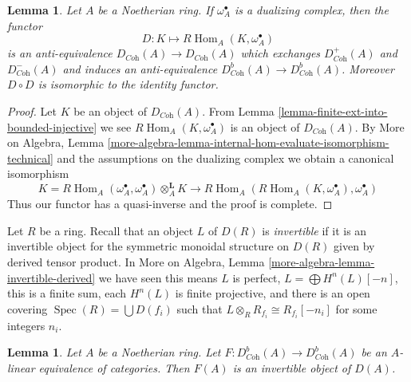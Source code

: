 \documentclass{stacks-project}
\theoremstyle{plain}
\newtheorem{lemma}[subsection]{Lemma}
\theoremstyle{definition}
\theoremstyle{remark}
\numberwithin{equation}{subsection}
\def\Spec{\mathop{\mathrm{Spec}}}
\def\Hom{\mathop{\mathrm{Hom}}\nolimits}
\begin{document}
\begin{lemma}
\label{lemma-dualizing}
Let $A$ be a Noetherian ring. If $\omega_A^\bullet$ is a dualizing
complex, then the functor
$$
D : K \longmapsto R\Hom_A(K, \omega_A^\bullet)
$$
is an anti-equivalence $D_{\textit{Coh}}(A) \to D_{\textit{Coh}}(A)$
which exchanges $D^+_{\textit{Coh}}(A)$ and $D^-_{\textit{Coh}}(A)$
and induces an anti-equivalence
$D^b_{\textit{Coh}}(A) \to D^b_{\textit{Coh}}(A)$.
Moreover $D \circ D$ is isomorphic to the identity functor.
\end{lemma}

\begin{proof}
Let $K$ be an object of $D_{\textit{Coh}}(A)$. From
Lemma \ref{lemma-finite-ext-into-bounded-injective}
we see $R\Hom_A(K, \omega_A^\bullet)$ is an object of $D_{\textit{Coh}}(A)$.
By More on Algebra, Lemma
\ref{more-algebra-lemma-internal-hom-evaluate-isomorphism-technical}
and the assumptions on the dualizing complex
we obtain a canonical isomorphism
$$
K = R\Hom_A(\omega_A^\bullet, \omega_A^\bullet) \otimes_A^\mathbf{L} K
\longrightarrow
R\Hom_A(R\Hom_A(K, \omega_A^\bullet), \omega_A^\bullet)
$$
Thus our functor has a quasi-inverse and the proof is complete.
\end{proof}

\noindent
Let $R$ be a ring. Recall that an object $L$ of $D(R)$ is
{\it invertible} if it is an invertible object for the
symmetric monoidal structure on $D(R)$ given by derived
tensor product. In
More on Algebra, Lemma \ref{more-algebra-lemma-invertible-derived}
we have seen this means $L$ is perfect, $L = \bigoplus H^n(L)[-n]$,
this is a finite sum, each $H^n(L)$ is finite projective,
and there is an open covering $\Spec(R) = \bigcup D(f_i)$ such that
$L \otimes_R R_{f_i} \cong R_{f_i}[-n_i]$ for some integers $n_i$.

\begin{lemma}
\label{lemma-equivalence-comes-from-invertible}
Let $A$ be a Noetherian ring. Let
$F : D^b_{\textit{Coh}}(A) \to D^b_{\textit{Coh}}(A)$ be an $A$-linear
equivalence of categories. Then $F(A)$ is an invertible object of $D(A)$.
\end{lemma}
\end{document}
